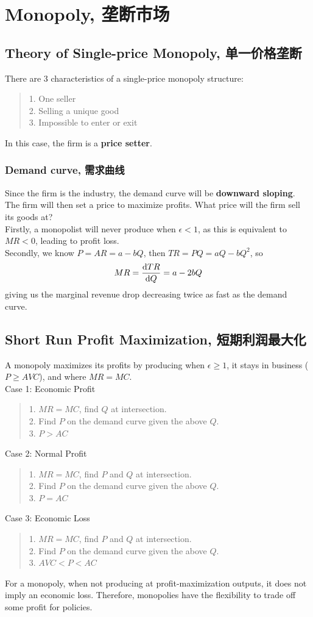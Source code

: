 \section{Monopoly, 垄断市场}
\subsection{Theory of Single-price Monopoly, 单一价格垄断}
There are $3$ characteristics of a single-price monopoly structure:
\begin{quote}
    1. One seller \\
    2. Selling a unique good \\
    3. Impossible to enter or exit
\end{quote}
In this case, the firm is a \textbf{price setter}.
\subsubsection{Demand curve, 需求曲线}
Since the firm is the industry, the demand curve will be \textbf{downward sloping}. \\
The firm will then set a price to maximize profits. What price will the firm sell its goods at? \\
Firstly, a monopolist will never produce when $\epsilon < 1$, as this is equivalent to $MR < 0$, leading to profit loss. \\
Secondly, we know $P = AR = a - bQ$, then $TR = PQ = aQ - bQ^2$, so
$$MR = \dv{TR}{Q} = a - 2bQ$$
giving us the marginal revenue drop decreasing twice as fast as the demand curve.

\subsection{Short Run Profit Maximization, 短期利润最大化}
A monopoly maximizes its profits by producing when $\epsilon \ge 1$, it stays in business ($P \ge AVC$), and where $MR = MC$. \\
Case 1: Economic Profit
\begin{quote}
    1. $MR = MC$, find $Q$ at intersection. \\
    2. Find $P$ on the demand curve given the above $Q$. \\
    3. $P > AC$
\end{quote}
Case 2: Normal Profit
\begin{quote}
    1. $MR = MC$, find $P$ and $Q$ at intersection. \\
    2. Find $P$ on the demand curve given the above $Q$. \\
    3. $P = AC$
\end{quote}
Case 3: Economic Loss
\begin{quote}
    1. $MR = MC$, find $P$ and $Q$ at intersection. \\
    2. Find $P$ on the demand curve given the above $Q$. \\
    3. $AVC < P < AC$
\end{quote}
For a monopoly, when not producing at profit-maximization outputs, it does not imply an economic loss. Therefore, monopolies have the flexibility to trade off some profit for policies.

